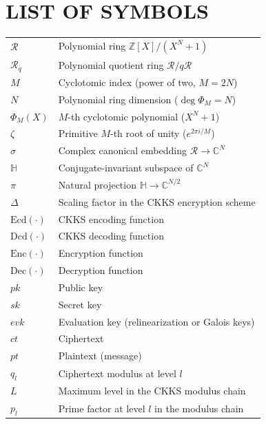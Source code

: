 \chapter*{LIST OF SYMBOLS}
\vspace{2\baselineskip}

\begin{longtable}{@{}p{3.5cm}p{11cm}@{}}
$\mathcal{R}$        & Polynomial ring $\mathbb{Z}[X]/(X^N + 1)$ \\
$\mathcal{R}_q$      & Polynomial quotient ring $\mathcal{R}/q\mathcal{R}$ \\
$M$                  & Cyclotomic index (power of two, $M = 2N$) \\
$N$                  & Polynomial ring dimension ($\deg \Phi_M = N$) \\
$\Phi_M(X)$          & $M$-th cyclotomic polynomial ($X^N + 1$) \\
$\zeta$              & Primitive $M$-th root of unity ($e^{2\pi i / M}$) \\
$\sigma$             & Complex canonical embedding $\mathcal{R} \to \mathbb{C}^N$ \\
$\mathbb{H}$         & Conjugate-invariant subspace of $\mathbb{C}^N$ \\
$\pi$                & Natural projection $\mathbb{H} \to \mathbb{C}^{N/2}$ \\
$\Delta$             & Scaling factor in the CKKS encryption scheme \\
$\mathrm{Ecd}(\cdot)$ & CKKS encoding function \\
$\mathrm{Dcd}(\cdot)$ & CKKS decoding function \\
$\mathrm{Enc}(\cdot)$ & Encryption function \\
$\mathrm{Dec}(\cdot)$ & Decryption function \\
$pk$                 & Public key \\
$sk$                 & Secret key \\
$evk$                & Evaluation key (relinearization or Galois keys) \\
$ct$                 & Ciphertext \\
$pt$                 & Plaintext (message) \\
$q_l$                & Ciphertext modulus at level $l$ \\
$L$                  & Maximum level in the CKKS modulus chain \\
$p_l$                & Prime factor at level $l$ in the modulus chain \\

\end{longtable}
